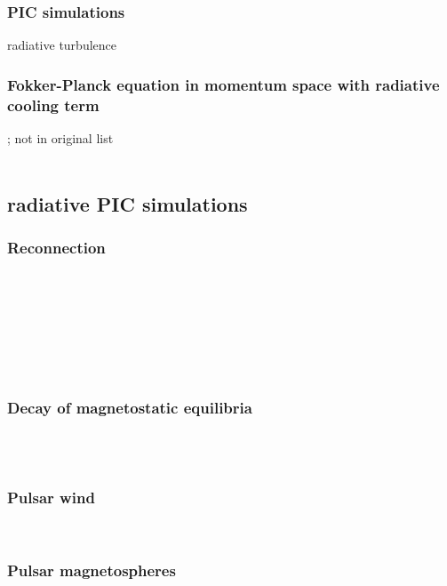 \documentclass[usenatbib,twocolumn]{aastex63}
\begin{document}
\subsubsection{PIC simulations}
\citep{Zhdankin_2019b} radiative turbulence\\


\subsubsection{Fokker-Planck equation in momentum space with radiative cooling term}
\citep{Schlickeiser_1984, Schlickeiser_1985}; not in original list \citep{Schlickeiser_1989} \\
\citep{Stawarz_2008} \\


\subsection{radiative PIC simulations}

\subsubsection{Reconnection}
\citep{Jaroschek_2009} \\
\citep{Cerutti_2013, Cerutti_2014, Cerutti_2014a} \\
\citep{Kagan_2016, Kagan_2016b} \\
\citep{Hakobyan_2019} \\
\citep{Werner_2019} \\
\citep{Schoeffler_2019} \\

\subsubsection{Decay of magnetostatic equilibria}
\citep{Yuan_2016} \\
\citep{Nalewajko_2018} \\

\subsubsection{Pulsar wind}
\citep{Cerutti_2017} \\

\subsubsection{Pulsar magnetospheres}
\citep{Cerutti_2016a} \\
\citep{Philippov_2018} \\
\end{document}
